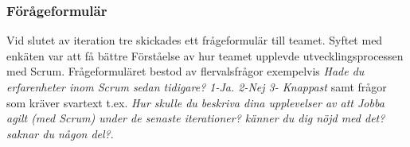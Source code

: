 \subsubsection {Förågeformulär}
Vid slutet av iteration tre skickades ett frågeformulär till teamet. Syftet med enkäten var att få bättre Förståelse av hur teamet upplevde utvecklingsprocessen med Scrum. Frågeformuläret bestod av flervalsfrågor exempelvis \textit{Hade du erfarenheter inom Scrum sedan tidigare? 1-Ja. 2-Nej 3- Knappast} samt frågor som kräver svartext t.ex. \textit{Hur skulle du beskriva dina upplevelser av att Jobba agilt (med Scrum) under de senaste iterationer? känner du dig nöjd med det? saknar du någon del?}.